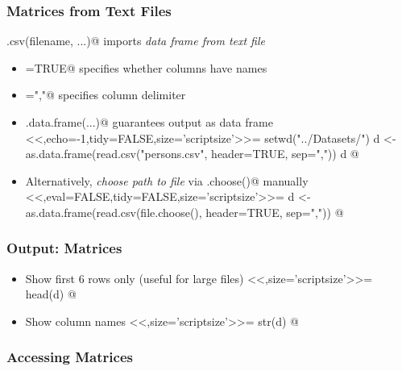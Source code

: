 \documentclass[%
  final,
  11pt, 
  show notes, %
  t, %
  fleqn, %
]{beamer}
\begin{document}
\begin{frame}[fragile]
  \frametitle{Matrices from Text Files}
\verb@read.csv(filename, ...)@ imports \emph{data frame from text file}
\begin{itemize}
\item \verb@header=TRUE@ specifies whether columns have names
\item \verb@sep=","@ specifies column delimiter
\item \verb@as.data.frame(...)@ guarantees output as data frame
<<,echo=-1,tidy=FALSE,size='scriptsize'>>=
setwd("../Datasets/")
d <- as.data.frame(read.csv("persons.csv", 
     header=TRUE, sep=","))
d
@
\item Alternatively, \emph{choose path to file} via \verb@file.choose()@ manually
<<,eval=FALSE,tidy=FALSE,size='scriptsize'>>=
d <- as.data.frame(read.csv(file.choose(), 
     header=TRUE, sep=","))
@
\end{itemize}
\end{frame}

\begin{frame}[fragile]
  \frametitle{Output: Matrices}
\begin{itemize}
\item Show first $6$ rows only (useful for large files)
<<,size='scriptsize'>>=
head(d)
@
\item Show column names 
<<,size='scriptsize'>>=
str(d)
@
\end{itemize}
\end{frame}

\begin{frame}[fragile]
  \frametitle{Accessing Matrices}
\vfill
{}
\vfill
\end{frame}
\end{document}
